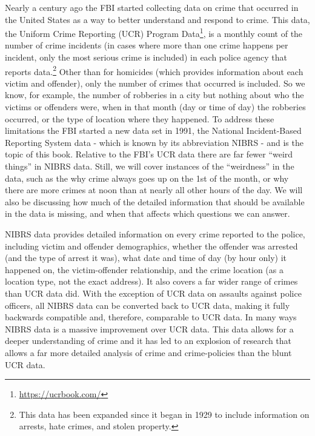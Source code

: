 \documentclass[
]{krantz}
\renewcommand{\href}[2]{#2\footnote{\url{#1}}}
\begin{document}
Nearly a century ago the FBI started collecting data on
crime that occurred in the United States as a way to better
understand and respond to crime. This data, the
\href{https://ucrbook.com/}{Uniform Crime Reporting (UCR)
Program Data}, is a monthly count of the number of crime
incidents (in cases where more than one crime happens per
incident, only the most serious crime is included) in each
police agency that reports data.\footnote{This data has been
  expanded since it began in 1929 to include information on
  arrests, hate crimes, and stolen property.} Other than for
homicides (which provides information about each victim and
offender), only the number of crimes that occurred is
included. So we know, for example, the number of robberies
in a city but nothing about who the victims or offenders
were, when in that month (day or time of day) the robberies
occurred, or the type of location where they happened. To
address these limitations the FBI started a new data set in
1991, the National Incident-Based Reporting System data -
which is known by its abbreviation NIBRS - and is the topic
of this book. Relative to the FBI's UCR data there are far
fewer ``weird things'' in NIBRS data. Still, we will cover
instances of the ``weirdness'' in the data, such as the why
crime always goes up on the 1st of the month, or why there
are more crimes at noon than at nearly all other hours of
the day. We will also be discussing how much of the detailed
information that should be available in the data is missing,
and when that affects which questions we can answer.

NIBRS data provides detailed information on every crime
reported to the police, including victim and offender
demographics, whether the offender was arrested (and the
type of arrest it was), what date and time of day (by hour
only) it happened on, the victim-offender relationship, and
the crime location (as a location type, not the exact
address). It also covers a far wider range of crimes than
UCR data did. With the exception of UCR data on assaults
against police officers, all NIBRS data can be converted
back to UCR data, making it fully backwards compatible and,
therefore, comparable to UCR data. In many ways NIBRS data
is a massive improvement over UCR data. This data allows for
a deeper understanding of crime and it has led to an
explosion of research that allows a far more detailed
analysis of crime and crime-policies than the blunt UCR
data.
\end{document}

